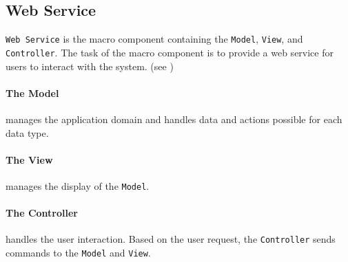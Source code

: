 \subsection{Web Service}\label{arch:webservice}
\texttt{Web Service} is the macro component containing the \texttt{Model}, \texttt{View}, and \texttt{Controller}.
The task of the macro component is to provide a web service for users to interact with the system. (see )

\paragraph{The Model} manages the application domain and handles data and actions possible for each data type.

\paragraph{The View} manages the display of the \texttt{Model}.

\paragraph{The Controller} handles the user interaction. Based on the user request, the \texttt{Controller} sends commands to the \texttt{Model} and \texttt{View}.
